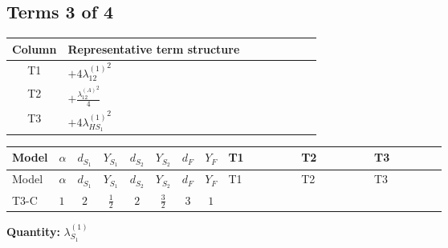 \documentclass[8pt]{article}
\begin{document}
\begin{landscape}
\subsection*{Terms 3 of 4}
\begin{center}
\begin{tabular}{@{}c >{\raggedright\arraybackslash}p{0.82\linewidth}@{}}
\toprule
Column & Representative term structure \\
\midrule
T1 & \(\displaystyle +4 {\lambda_{12}^{(1)}}^2\) \\
\midrule
T2 & \(\displaystyle +\frac{{\lambda_{12}^{(A)}}^2}{4}\) \\
\midrule
T3 & \(\displaystyle +4 {\lambda_{HS_1}^{(1)}}^2\) \\
\midrule
\bottomrule
\end{tabular}
\end{center}
\smallskip
\tiny
\begin{longtable}{@{}llcccccc >{\raggedright\arraybackslash}p{0.21\linewidth} >{\raggedright\arraybackslash}p{0.21\linewidth} >{\raggedright\arraybackslash}p{0.21\linewidth}@{}}
\toprule
Model & $\alpha$ & $d_{S_1}$ & $Y_{S_1}$ & $d_{S_2}$ & $Y_{S_2}$ & $d_F$ & $Y_F$ & T1 & T2 & T3 \\
\midrule
\endfirsthead
\toprule
Model & $\alpha$ & $d_{S_1}$ & $Y_{S_1}$ & $d_{S_2}$ & $Y_{S_2}$ & $d_F$ & $Y_F$ & T1 & T2 & T3 \\
\midrule
\endhead
T3-C & $1$ & $2$ & $\frac{1}{2}$ & $2$ & $\frac{3}{2}$ & $3$ & $1$ & \scriptsize\adjustbox{max width=\linewidth}{$\begin{gathered} +4 {\lambda_{12}^{(1)}}^2\end{gathered}$} & \scriptsize\adjustbox{max width=\linewidth}{$\begin{gathered} +\frac{{\lambda_{12}^{(A)}}^2}{4}\end{gathered}$} & \scriptsize\adjustbox{max width=\linewidth}{$\begin{gathered} +4 {\lambda_{HS_1}^{(1)}}^2\end{gathered}$} \\
\midrule
\bottomrule
\end{longtable}
\clearpage
\noindent\textbf{Quantity: }$\lambda_{S_1}^{(1)}$\par\smallskip

\end{landscape}
\end{document}
